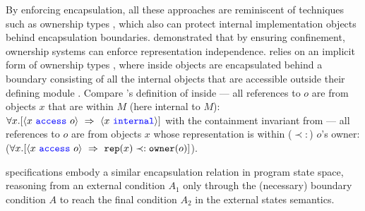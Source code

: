





By enforcing encapsulation, %
all these approaches are reminiscent of techniques such as
ownership types \cite{ownalias,NobPotVitECOOP98},
which also can 
protect internal implementation objects behind 
encapsulation boundaries.  \cite{Banerjee:2005,encaps} demonstrated that by
ensuring confinement, ownership
systems can enforce representation independence.
\Nec relies on an implicit form of ownership types \cite{confined},
where inside objects are encapsulated behind a boundary 
consisting of all the internal objects that are accessible outside their
defining module \cite{TAME2003}.  
Compare 
\Nec's definition of %
inside
--- all references to $o$ are from objects $x$
that are within $M$ (here internal to $M$):
$\all{x}{\access{x}{o}\ \Rightarrow\ \internal{x}}$
with the containment invariant 
from  ---
all references to $o$ are from objects $x$
whose representation is within ($\prec:$) $o$'s owner:
($\all{x}{\access{x}{o}\ \Rightarrow\ \texttt{rep}(x) \prec:
  \texttt{owner}(o)  }$).

%
% 
%
%
\Nec specifications embody a similar encapsulation
relation in program state space, \eg reasoning
from an external condition $A_1$ only through the (necessary) boundary
condition $A$ to reach the final condition $A_2$ in the external
states semantics.





